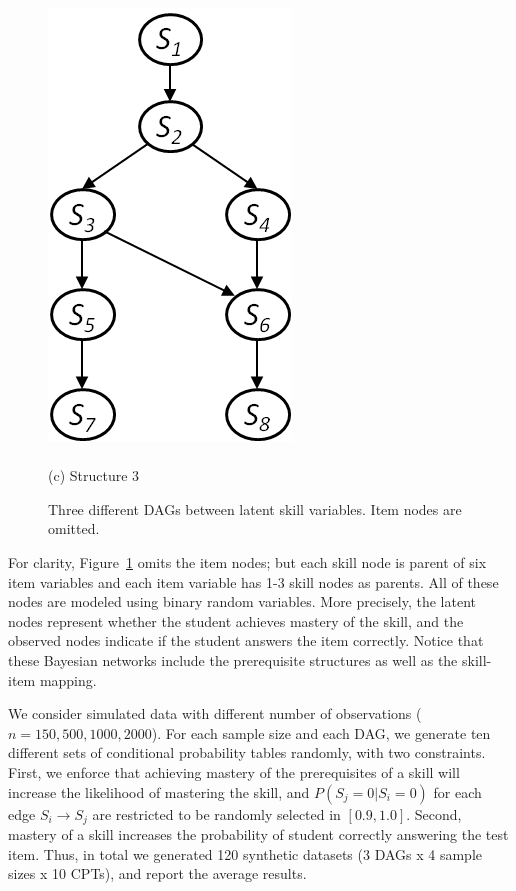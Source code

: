 \documentclass{edm_template}
\begin{document}
\begin{figure}[!ht]
\begin{minipage}[b]{0.45\linewidth}
			\includegraphics[width=0.7\linewidth]{figures/model3.png}\\~\\
			(c) Structure 3
		\end{minipage}	
		\caption{Three different DAGs between latent skill variables.  Item nodes are omitted.}
		\label{fig:syn-nets}
	\end{figure} 
	
	For clarity, Figure~\ref{fig:syn-nets}  omits the item nodes;
	but each skill node is parent of six item variables and each item variable has 1-3 skill nodes as parents.
	All of these nodes are modeled using binary random variables.
	More precisely, the latent  nodes represent whether the student  achieves mastery of the skill,
	and the observed nodes indicate if the student answers the item correctly.
	Notice that these Bayesian networks include the prerequisite structures as well as the skill-item mapping.
	
	We consider simulated data with different number of observations ($n=150, 500, 1000, 2000$).
	For each sample size and each  DAG, we generate ten different sets of conditional probability tables
	randomly, with two constraints.
	First, we enforce that achieving mastery of the prerequisites of a skill will increase the likelihood of mastering the skill,
	and $P(S_j=0|S_i=0)$ for each edge $S_i\rightarrow S_j$ are restricted to be randomly selected in $[0.9, 1.0]$.
	Second, mastery of a skill increases the probability of student correctly answering the test item. 
	Thus, in total we generated 120 synthetic datasets (3 DAGs x 4 sample sizes x 10 CPTs), and  report the average results.
	
\end{document}
